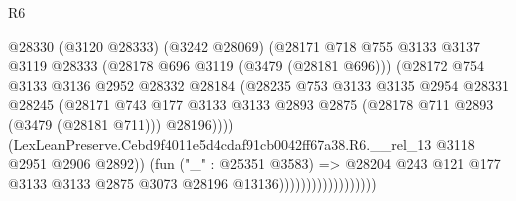 \begin{lexlean}{R6}
\begin{coremodule}
                                      @28330
                                        (@3120 @28333)
                                        (@3242 @28069)
                                        (@28171
                                          @718
                                          @755
                                          @3133
                                          @3137
                                          @3119
                                          @28333
                                          (@28178 @696 @3119 (@3479 (@28181 @696)))
                                          (@28172
                                            @754
                                            @3133
                                            @3136
                                            @2952
                                            @28332
                                            @28184
                                            (@28235
                                              @753
                                              @3133
                                              @3135
                                              @2954
                                              @28331
                                              @28245
                                              (@28171
                                                @743
                                                @177
                                                @3133
                                                @3133
                                                @2893
                                                @2875
                                                (@28178 @711 @2893 (@3479 (@28181 @711)))
                                                @28196))))
                                        (LexLeanPreserve.Cebd9f4011e5d4cdaf91cb0042ff67a38.R6.__rel_13
                                          @3118
                                          @2951
                                          @2906
                                          @2892))
                                      (fun ("_" : @25351 @3583) =>
                                      @28204
                                        @243
                                        @121
                                        @177
                                        @3133
                                        @3133
                                        @2875
                                        @3073
                                        @28196
                                        @13136))))))))))))))))))

\end{coremodule}
\end{lexlean}
